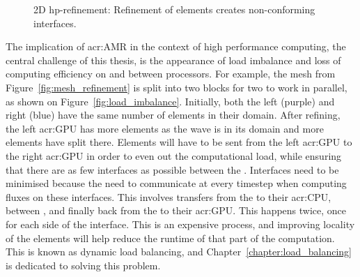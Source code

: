 \begin{figure}[H]
    \centering
    
    \caption{2D hp-refinement: Refinement of elements creates non-conforming interfaces.}\label{fig:hp-refinement}
\end{figure}

The implication of \acrshort{acr:AMR} in the context of high performance computing, the central
challenge of this thesis, is the appearance of load imbalance and loss of computing efficiency on
and between processors. For example, the mesh from Figure~\ref{fig:mesh_refinement} is split into
two blocks for two  to work in parallel, as shown on
Figure~\ref{fig:load_imbalance}. Initially, both the left (purple) and right (blue)
 have the same number of elements in their domain. After refining, the left
\acrshort{acr:GPU} has more elements as the wave is in its domain and more elements have split
there. Elements will have to be sent from the left \acrshort{acr:GPU} to the right
\acrshort{acr:GPU} in order to even out the computational load, while ensuring that there are as few
interfaces as possible between the . Interfaces need to be minimised because the
 need to communicate at every timestep when computing fluxes on these
interfaces. This involves transfers from the  to their \acrshort{acr:CPU},
between , and finally back from the  to their
\acrshort{acr:GPU}. This happens twice, once for each side of the interface. This is an expensive
process, and improving locality of the elements will help reduce the runtime of that part of the
computation. This is known as dynamic load balancing, and Chapter~\ref{chapter:load_balancing} is
dedicated to solving this problem.

